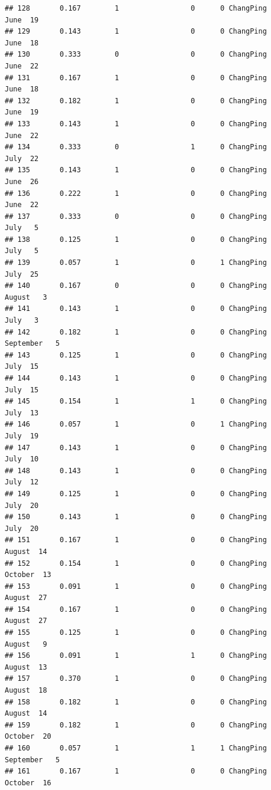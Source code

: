 \documentclass[
]{article}
\begin{document}
\begin{verbatim}
## 128       0.167        1                 0      0 ChangPing      June  19
## 129       0.143        1                 0      0 ChangPing      June  18
## 130       0.333        0                 0      0 ChangPing      June  22
## 131       0.167        1                 0      0 ChangPing      June  18
## 132       0.182        1                 0      0 ChangPing      June  19
## 133       0.143        1                 0      0 ChangPing      June  22
## 134       0.333        0                 1      0 ChangPing      July  22
## 135       0.143        1                 0      0 ChangPing      June  26
## 136       0.222        1                 0      0 ChangPing      June  22
## 137       0.333        0                 0      0 ChangPing      July   5
## 138       0.125        1                 0      0 ChangPing      July   5
## 139       0.057        1                 0      1 ChangPing      July  25
## 140       0.167        0                 0      0 ChangPing    August   3
## 141       0.143        1                 0      0 ChangPing      July   3
## 142       0.182        1                 0      0 ChangPing September   5
## 143       0.125        1                 0      0 ChangPing      July  15
## 144       0.143        1                 0      0 ChangPing      July  15
## 145       0.154        1                 1      0 ChangPing      July  13
## 146       0.057        1                 0      1 ChangPing      July  19
## 147       0.143        1                 0      0 ChangPing      July  10
## 148       0.143        1                 0      0 ChangPing      July  12
## 149       0.125        1                 0      0 ChangPing      July  20
## 150       0.143        1                 0      0 ChangPing      July  20
## 151       0.167        1                 0      0 ChangPing    August  14
## 152       0.154        1                 0      0 ChangPing   October  13
## 153       0.091        1                 0      0 ChangPing    August  27
## 154       0.167        1                 0      0 ChangPing    August  27
## 155       0.125        1                 0      0 ChangPing    August   9
## 156       0.091        1                 1      0 ChangPing    August  13
## 157       0.370        1                 0      0 ChangPing    August  18
## 158       0.182        1                 0      0 ChangPing    August  14
## 159       0.182        1                 0      0 ChangPing   October  20
## 160       0.057        1                 1      1 ChangPing September   5
## 161       0.167        1                 0      0 ChangPing   October  16

\end{verbatim}
\end{document}
